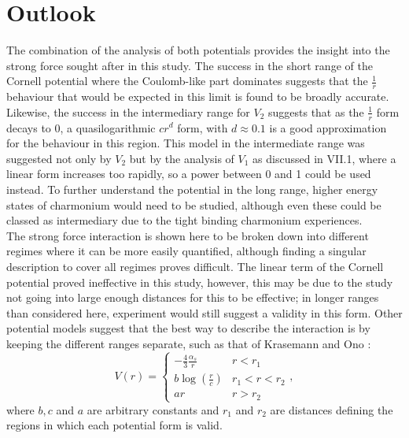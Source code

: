 \documentclass[10pt, twocolumn]{article}
\begin{document}
\section{Outlook}
The combination of the analysis of both potentials provides the insight into the strong force sought after in this study. 
The success in the short range of the Cornell potential where the Coulomb-like part dominates suggests that the $\frac{1}{r}$ behaviour that would be expected in this limit is found to be broadly accurate.
Likewise, the success in the intermediary range for $V_2$ suggests that as the $\frac{1}{r}$ form decays to 0, a quasilogarithmic $cr^d$ form, with $d\approx0.1$ is a good approximation for the behaviour in this region. 
This model in the intermediate range was suggested not only by $V_2$ but by the analysis of $V_1$ as discussed in \RN{7}.1, where a linear form increases too rapidly, so a power between 0 and 1 could be used instead.
To further understand the potential in the long range, higher energy states of charmonium would need to be studied, although even these could be classed as intermediary due to the tight binding charmonium experiences.\\
The strong force interaction is shown here to be broken down into different regimes where it can be more easily quantified, although finding a singular description to cover all regimes proves difficult. 
The linear term of the Cornell potential proved ineffective in this study, however, this may be due to the study not going into large enough distances for this to be effective; in longer ranges than considered here, experiment would still suggest a validity in this form.
Other potential models suggest that the best way to describe the interaction is by keeping the different ranges separate, such as that of Krasemann and Ono \cite{9}: 
\begin{equation}
    V(r) = \begin{cases} -\frac43 \frac{\alpha_s}{r} & r < r_1 \\ b\log\left(\frac{r}{c}\right) & r_1 < r < r_2 \\ ar & r > r_2 \end{cases},
\end{equation}
where $b,c$ and $a$ are arbitrary constants and $r_1$ and $r_2$ are distances defining the regions in which each potential form is valid.
\end{document}
